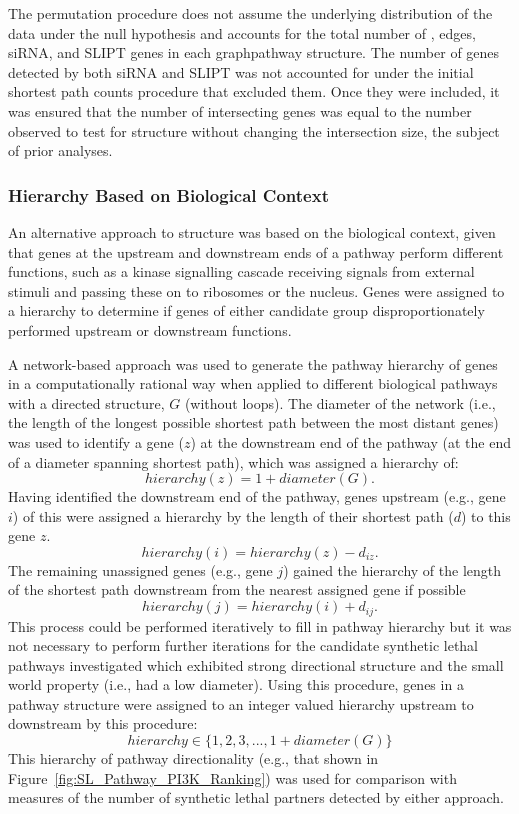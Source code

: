 The permutation procedure does not assume the underlying distribution of the data under the null hypothesis and accounts for the total number of , \glspl{edge}, \gls{siRNA}, and \gls{SLIPT} genes in each \gls{graph}{pathway} structure. The number of genes detected by both \gls{siRNA} and \gls{SLIPT} was not accounted for under the initial \gls{shortest path} counts procedure that excluded them. Once they were included, it was ensured that the number of intersecting genes was equal to the number observed to test for  structure without changing the intersection size, the subject of prior analyses.

\subsubsection{Hierarchy Based on Biological Context} \label{methods:pathway_rank}
An alternative approach to  structure was based on the biological context, given that genes at the upstream and downstream ends of a pathway perform different functions, such as a kinase signalling cascade receiving signals from external stimuli and passing these on to ribosomes or the nucleus. Genes were assigned to a hierarchy to determine if genes of either candidate group disproportionately performed upstream or downstream functions.

A network-based approach was used to generate the pathway hierarchy of genes in a computationally rational way when applied to different biological pathways with a directed  structure, $G$ (without loops). The diameter of the network (i.e., the length of the longest possible \gls{shortest path} between the most distant genes) was used to identify a gene ($z$) at the downstream end of the pathway (at the end of a diameter spanning \gls{shortest path}), which was assigned a hierarchy of: $$hierarchy(z) = 1 + diameter(G).$$ Having identified the downstream end of the pathway, genes upstream (e.g., gene $i$) of this were assigned a hierarchy by the length of their \gls{shortest path} ($d$) to this gene $z$. $$hierarchy(i) = hierarchy(z) - d_{iz}.$$ The remaining unassigned genes (e.g., gene $j$) gained the hierarchy of the length of the \gls{shortest path} downstream from the nearest assigned gene if possible $$hierarchy(j) = hierarchy(i) + d_{ij}.$$ This process could be performed iteratively to fill in pathway hierarchy but it was not necessary to perform further iterations for the candidate \gls{synthetic lethal} pathways investigated which exhibited strong directional structure and the \gls{small world} property (i.e., had a low diameter). Using this procedure, genes in a pathway  structure were assigned to an integer valued hierarchy upstream to downstream by this procedure: $$hierarchy \in \{1, 2, 3, ..., 1 + diameter(G)\}$$
This hierarchy of pathway directionality (e.g.,  that shown in Figure~\ref{fig:SL_Pathway_PI3K_Ranking}) was used for comparison with measures of the number of \gls{synthetic lethal} partners detected by either approach.

